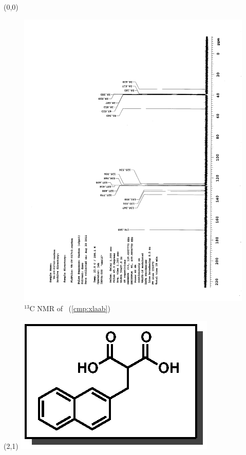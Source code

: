 \clearpage
\begin{textblock}{20}(0,0)
\begin{figure}[htb]
\caption{$^{13}$C NMR of  \CMPxlaab\ (\ref{cmp:xlaab})}
\includegraphics[scale=0.75, trim = 0mm 0mm 0mm 5mm,
clip]{chp_asymmetric/images/nmr/xlaabC}
\vspace{-100pt}
\end{figure}
\end{textblock}
\begin{textblock}{1}(2,1)
\includegraphics[scale=0.8, angle=90]{chp_asymmetric/images/xlaab}
\end{textblock}
\clearpage

